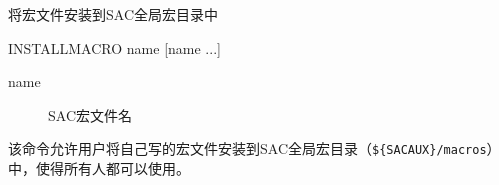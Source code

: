\label{cmd:installmacro}

将宏文件安装到SAC全局宏目录中

\begin{SACSTX}
INSTALLMACRO name [name ...]
\end{SACSTX}

\begin{description}
\item [name] SAC宏文件名
\end{description}

该命令允许用户将自己写的宏文件安装到SAC全局宏目录（\verb|${SACAUX}/macros|）
中，使得所有人都可以使用。
